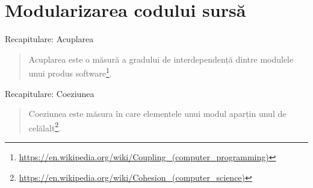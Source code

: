 \documentclass[presentation]{beamer}
\begin{document}
\section{Modularizarea codului sursă}
\label{sec:org62bfdf1}
\begin{frame}[label={sec:org0fabc35}]{Recapitulare: Acuplarea}
\begin{quotation} %
\alert{Acuplarea} este o măsură a gradului de interdependență dintre modulele unui produs software\footnote{\url{https://en.wikipedia.org/wiki/Coupling\_(computer\_programming)}}.
\end{quotation}
\end{frame}
\begin{frame}[label={sec:org77342e3}]{Recapitulare: Coeziunea}
\begin{quotation} %
\alert{Coeziunea} este măsura în care elementele unui modul aparțin unul de celălalt\footnote{\url{https://en.wikipedia.org/wiki/Cohesion\_(computer\_science)}}.
\end{quotation}
\end{frame}
\end{document}
